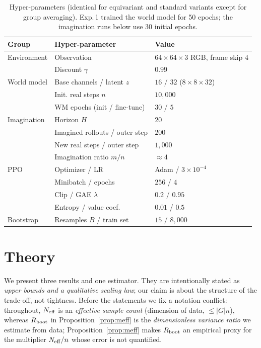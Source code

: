 \documentclass[preprint,12pt]{elsarticle}
\begin{document}
\begin{table}[t]
\centering
\caption{Hyper-parameters (identical for equivariant and standard variants
except for group averaging). Exp.\,1 trained the world model for 50 epochs;
the imagination runs below use 30 initial epochs.}
\label{tab:hyper}
\footnotesize\setlength{\tabcolsep}{3pt}
\begin{tabular}{@{}lll@{}}
\toprule
Group & Hyper-parameter & Value \\
\midrule
Environment & Observation & $64\times64\times3$ RGB, frame skip $4$ \\
            & Discount $\gamma$ & $0.99$ \\
World model & Base channels / latent $z$ & $16$ / $32$ ($8\times8\times32$) \\
            & Init. real steps $n$ & $10{,}000$ \\
            & WM epochs (init / fine-tune) & $30$ / $5$ \\
Imagination & Horizon $H$ & $20$ \\
            & Imagined rollouts / outer step & $200$ \\
            & New real steps / outer step & $1{,}000$ \\
            & Imagination ratio $m/n$ & $\approx4$ \\
PPO         & Optimizer / LR & Adam / $3\times10^{-4}$ \\
            & Minibatch / epochs & $256$ / $4$ \\
            & Clip / GAE $\lambda$ & $0.2$ / $0.95$ \\
            & Entropy / value coef. & $0.01$ / $0.5$ \\
Bootstrap   & Resamples $B$ / train set & $15$ / $8{,}000$ \\
\bottomrule
\end{tabular}
\end{table}

\section{Theory}\label{sec:theory}
We present three results and one estimator. They are intentionally stated as
\emph{upper bounds and a qualitative scaling law}; our claim is about the
structure of the trade-off, not tightness. Before the statements we fix a
notation conflict: throughout, $N_{\rm eff}$ is an \emph{effective sample
count} (dimension of data, $\le |G|n$), whereas $R_{\rm boot}$ in
Proposition~\ref{prop:meff} is the \emph{dimensionless variance ratio} we
estimate from data; Proposition~\ref{prop:meff} makes $R_{\rm boot}$ an
empirical proxy for the multiplier $N_{\rm eff}/n$ whose error is not
quantified.
\end{document}

